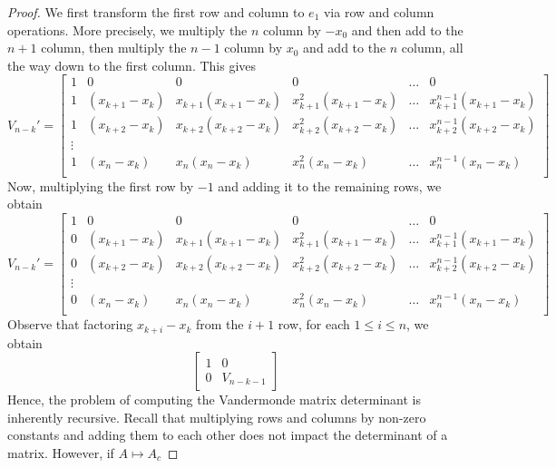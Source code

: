 \documentclass[12pt]{article}
\theoremstyle{plain}
\theoremstyle{definition}
\theoremstyle{remark}
\numberwithin{equation}{section}  %
\begin{document}
\begin{proof}
We first transform the first row and column to $e_1$ 
via row and column operations. More precisely, we multiply the $n$ column by $-x_0$ and then
add to the $n+1$ column, then multiply the $n-1$ column by $x_0$ and add
to the $n$ column, all the way down to the first column. This gives
\begin{equation*}
V_{n-k}' = \begin{bmatrix}
1 & 0 & 0 & 0 & \ldots  & 0 \\
1 & (x_{k+1} - x_k) & x_{k+1}(x_{k+1} - x_k) & x_{k+1}^2(x_{k+1} - x_k) & \ldots & x_{k+1}^{n-1}(x_{k+1} - x_k) \\
1 & (x_{k+2} - x_k) & x_{k+2}(x_{k+2} - x_k) & x_{k+2}^2(x_{k+2} - x_k) & \ldots & x_{k+2}^{n-1}(x_{k+2} - x_k) \\
\vdots \\
1 & (x_n - x_k) & x_n(x_n - x_k) & x_n^2(x_n - x_k) & \ldots & x_n^{n-1}(x_n - x_k) \\
\end{bmatrix}
\end{equation*}
Now, multiplying the first row by $-1$ and adding it to the remaining rows,
we obtain
\begin{equation*}
V_{n-k}' = \begin{bmatrix}
1 & 0 & 0 & 0 & \ldots & 0 \\
0 & (x_{k+1} - x_k) & x_{k+1}(x_{k+1} - x_k) & x_{k+1}^2(x_{k+1} - x_k) & \ldots & x_{k+1}^{n-1}(x_{k+1} - x_k) \\
0 & (x_{k+2} - x_k) & x_{k+2}(x_{k+2} - x_k) & x_{k+2}^2(x_{k+2} - x_k) & \ldots & x_{k+2}^{n-1}(x_{k+2} - x_k) \\
\vdots \\
0 & (x_n - x_k) & x_n(x_n - x_k) & x_n^2(x_n - x_k) & \ldots & x_n^{n-1}(x_n - x_k) \\
\end{bmatrix}
\end{equation*}
Observe that factoring $x_{k+i} -x_k$ from the $i+1$ row, for each $1 \le i \le n$, we obtain
\begin{equation*}
\begin{bmatrix}
1 & 0 \\
0 & V_{n-k-1}
\end{bmatrix}
\end{equation*}
Hence, the problem of computing the Vandermonde matrix determinant is inherently
recursive. Recall that multiplying rows and columns by non-zero constants and adding them to each
other does not impact the determinant of a matrix. However, if $A \mapsto A_c$

\end{proof}
\end{document}
